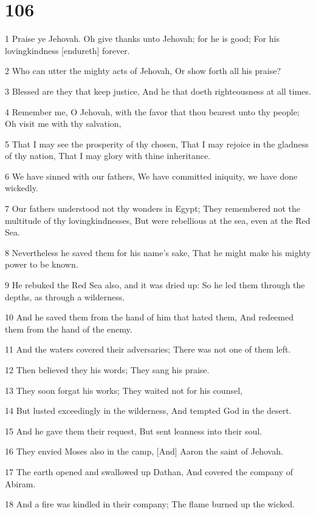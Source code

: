 \chapter{106}

\par 1 Praise ye Jehovah. Oh give thanks unto Jehovah; for he is good; For his lovingkindness [endureth] forever.
\par 2 Who can utter the mighty acts of Jehovah, Or show forth all his praise?
\par 3 Blessed are they that keep justice, And he that doeth righteousness at all times.
\par 4 Remember me, O Jehovah, with the favor that thou bearest unto thy people; Oh visit me with thy salvation,
\par 5 That I may see the prosperity of thy chosen, That I may rejoice in the gladness of thy nation, That I may glory with thine inheritance.
\par 6 We have sinned with our fathers, We have committed iniquity, we have done wickedly.
\par 7 Our fathers understood not thy wonders in Egypt; They remembered not the multitude of thy lovingkindnesses, But were rebellious at the sea, even at the Red Sea.
\par 8 Nevertheless he saved them for his name's sake, That he might make his mighty power to be known.
\par 9 He rebuked the Red Sea also, and it was dried up: So he led them through the depths, as through a wilderness.
\par 10 And he saved them from the hand of him that hated them, And redeemed them from the hand of the enemy.
\par 11 And the waters covered their adversaries; There was not one of them left.
\par 12 Then believed they his words; They sang his praise.
\par 13 They soon forgat his works; They waited not for his counsel,
\par 14 But lusted exceedingly in the wilderness, And tempted God in the desert.
\par 15 And he gave them their request, But sent leanness into their soul.
\par 16 They envied Moses also in the camp, [And] Aaron the saint of Jehovah.
\par 17 The earth opened and swallowed up Dathan, And covered the company of Abiram.
\par 18 And a fire was kindled in their company; The flame burned up the wicked.
